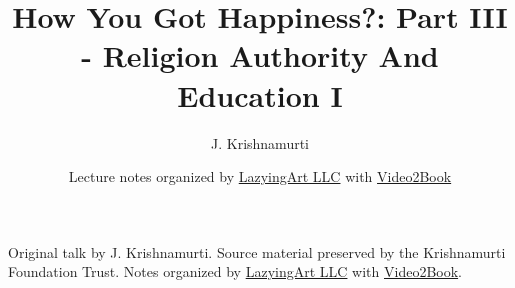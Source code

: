 \documentclass[11pt,oneside]{book}
\begin{document}
\frontmatter
\title{How You Got Happiness?: Part III - Religion Authority And Education I}
\author{J. Krishnamurti}
\date{Lecture notes organized by \href{https://lazying.art}{LazyingArt LLC} with \href{https://github.com/lachlanchen/Video2Book}{Video2Book}}
\maketitle
\begin{center}
\small Original talk by J. Krishnamurti. Source material preserved by the Krishnamurti Foundation Trust. Notes organized by \href{https://lazying.art}{LazyingArt LLC} with \href{https://github.com/lachlanchen/Video2Book}{Video2Book}.
\end{center}
\clearpage
\mainmatter

\end{document}
